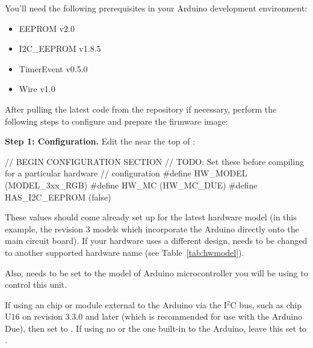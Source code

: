 You'll need the following prerequisites in your Arduino development environment:
\begin{itemize}
	\item EEPROM v2.0
	\item I2C\_EEPROM v1.8.5
	\item TimerEvent v0.5.0
	\item Wire v1.0
\end{itemize}

After pulling the latest code from the repository if necessary, perform the following steps to configure and
prepare the firmware image:

{\bfseries Step 1: Configuration.}\label{config-fw}
Edit the  near the top of :
\begin{SourceCode}
// BEGIN CONFIGURATION SECTION
// TODO: Set these before compiling for a particular hardware 
//       configuration
#define HW_MODEL (MODEL_3xx_RGB)
#define HW_MC (HW_MC_DUE)
#define HAS_I2C_EEPROM (false)
\end{SourceCode}

These values should come already set up for the latest hardware model (in this example,
the revision 3  models which incorporate the Arduino directly onto
the main circuit board). If your hardware uses a different design, %
 needs to be changed to another supported hardware
name (see Table~\ref{tab:hwmodel}).

Also,  needs to be set to the model of Arduino microcontroller you will be
using to control this unit.

If using an  chip or module external to the Arduino via the I$^2$C bus, such as 
chip U16 on  revision 3.3.0 and later (which is recommended for use with the Arduino Due), then set
 to . If using no  or the one built-in to the
Arduino, leave this set to .

